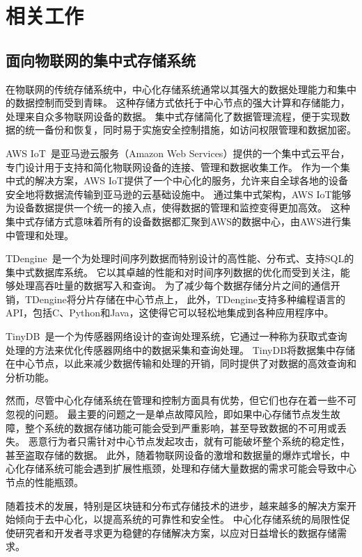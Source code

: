 \chapter{相关工作}
\section{面向物联网的集中式存储系统}
在物联网的传统存储系统中，中心化存储系统通常以其强大的数据处理能力和集中的数据控制而受到青睐。
这种存储方式依托于中心节点的强大计算和存储能力，处理来自众多物联网设备的数据。
集中式存储简化了数据管理流程，便于实现数据的统一备份和恢复，同时易于实施安全控制措施，如访问权限管理和数据加密。

AWS IoT~\cite{aws}是亚马逊云服务（Amazon Web Services）提供的一个集中式云平台，专门设计用于支持和简化物联网设备的连接、管理和数据收集工作。
作为一个集中式的解决方案，AWS IoT提供了一个中心化的服务，允许来自全球各地的设备安全地将数据流传输到亚马逊的云基础设施中。
通过集中式架构，AWS IoT能够为设备数据提供一个统一的接入点，使得数据的管理和监控变得更加高效。
这种集中式存储方式意味着所有的设备数据都汇聚到AWS的数据中心，由AWS进行集中管理和处理。

TDengine~\cite{tdengine}是一个为处理时间序列数据而特别设计的高性能、分布式、支持SQL的集中式数据库系统。
它以其卓越的性能和对时间序列数据的优化而受到关注，能够处理高吞吐量的数据写入和查询。
为了减少每个数据存储分片之间的通信开销，TDengine将分片存储在中心节点上，
此外，TDengine支持多种编程语言的API，包括C、Python和Java，这使得它可以轻松地集成到各种应用程序中。

TinyDB~\cite{madden2005tinydb}是一个为传感器网络设计的查询处理系统，它通过一种称为获取式查询处理的方法来优化传感器网络中的数据采集和查询处理。
TinyDB将数据集中存储在中心节点，以此来减少数据传输和处理的开销，同时提供了对数据的高效查询和分析功能。

然而，尽管中心化存储系统在管理和控制方面具有优势，但它们也存在着一些不可忽视的问题。
最主要的问题之一是单点故障风险，即如果中心存储节点发生故障，整个系统的数据存储功能可能会受到严重影响，甚至导致数据的不可用或丢失。
恶意行为者只需针对中心节点发起攻击，就有可能破坏整个系统的稳定性，甚至盗取存储的数据。
此外，随着物联网设备的激增和数据量的爆炸式增长，中心化存储系统可能会遇到扩展性瓶颈，处理和存储大量数据的需求可能会导致中心节点的性能瓶颈。

随着技术的发展，特别是区块链和分布式存储技术的进步，越来越多的解决方案开始倾向于去中心化，以提高系统的可靠性和安全性。
中心化存储系统的局限性促使研究者和开发者寻求更为稳健的存储解决方案，以应对日益增长的数据存储需求。


